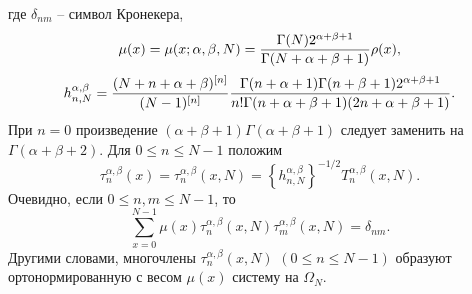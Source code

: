 где  $\delta_{nm}$ -- символ Кронекера,
\begin{equation}
 \mu(x)=\mu(x;\alpha,\beta,N)={\Gamma(N)2^{\alpha+\beta+1} \over
\Gamma(N+\alpha+\beta+1)}\rho(x),\label{sob-tcheb-difference-3.5}
\end{equation}
 \begin{equation}
h_{n,N}^{\alpha,\beta}={(N+n+\alpha+\beta)^{[n]}\over
(N-1)^{[n]}}{\Gamma(n+\alpha+1)\Gamma(n+\beta+1)
2^{\alpha+\beta+1}\over
n!\Gamma(n+\alpha+\beta+1)(2n+\alpha+\beta+1)}. \label{sob-tcheb-difference-3.6}
\end{equation}
 При $n=0$  произведение $(\alpha+\beta+1)\Gamma(\alpha+ \beta+1)$
следует заменить на $\Gamma(\alpha+\beta+2)$. Для $0\le n\le N-1$
положим
 \begin{equation}
  \tau_n^{\alpha,\beta}(x)=\tau_n^{\alpha,\beta}(x,N)=
\left\{h_{n,N}^{\alpha,\beta}\right\}^{-1/2}
T_n^{\alpha,\beta}(x,N).\label{sob-tcheb-difference-3.7}
\end{equation}
 Очевидно, если $0\le n,m\le N-1$, то
\begin{equation} \sum_{x=0}^{N-1}\mu(x)\tau_n^{\alpha,\beta}(x,N)
\tau_m^{\alpha,\beta}(x,N)=\delta_{nm}.\label{sob-tcheb-difference-3.8}
\end{equation}
Другими словами, многочлены $\tau_n^{\alpha,\beta}(x,N)$ $(0\le n\le N-1)$
образуют ортонормированную с весом $\mu(x)$ систему на
$\Omega_N$.

